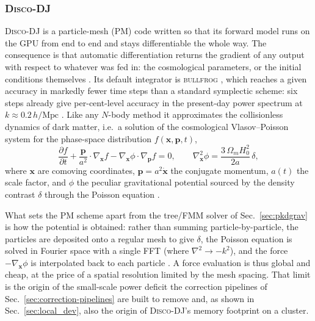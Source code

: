 \documentclass{report}
\begin{document}
\subsubsection{\textsc{Disco-DJ}}
\label{sec:discodj}

\textsc{Disco-DJ} is a particle-mesh (PM) code written so that its forward model runs on the GPU from end to end and stays differentiable the whole way. The consequence is that automatic differentiation returns the gradient of any output with respect to whatever was fed in: the cosmological parameters, or the initial conditions themselves \cite{list_disco-dj_2026}. Its default integrator is \textsc{bullfrog} \cite{rampf_bullfrog_2025}, which reaches a given accuracy in markedly fewer time steps than a standard symplectic scheme: six steps already give per-cent-level accuracy in the present-day power spectrum at \mbox{$k \approx 0.2\,h/\mathrm{Mpc}$} \cite{list_disco-dj_2026}. Like any $N$-body method it approximates the collisionless dynamics of dark matter, i.e.\ a solution of the cosmological Vlasov--Poisson system for the phase-space distribution $f(\mathbf{x},\mathbf{p},t)$,
\begin{equation}
  \frac{\partial f}{\partial t} + \frac{\mathbf{p}}{a^2}\cdot\nabla_{\mathbf{x}} f - \nabla_{\mathbf{x}}\phi\cdot\nabla_{\mathbf{p}} f = 0,
  \qquad \nabla_{\mathbf{x}}^2\phi = \frac{3\,\Omega_m H_0^2}{2a}\,\delta,
  \label{eq:vlasov_poisson}
\end{equation}
where $\mathbf{x}$ are comoving coordinates, $\mathbf{p} = a^2\dot{\mathbf{x}}$ the conjugate momentum, $a(t)$ the scale factor, and $\phi$ the peculiar gravitational potential sourced by the density contrast $\delta$ through the Poisson equation \cite{list_disco-dj_2026}.

What sets the PM scheme apart from the tree/FMM solver of Sec.~\ref{sec:pkdgrav} is how the potential is obtained: rather than summing particle-by-particle, the particles are deposited onto a regular mesh to give $\delta$, the Poisson equation is solved in Fourier space with a single FFT (where $\nabla^2 \to -k^2$), and the force $-\nabla_{\mathbf{x}}\phi$ is interpolated back to each particle \cite{list_disco-dj_2026}. A force evaluation is thus global and cheap, at the price of a spatial resolution limited by the mesh spacing. That limit is the origin of the small-scale power deficit the correction pipelines of Sec.~\ref{sec:correction-pipelines} are built to remove and, as shown in Sec.~\ref{sec:local_dev}, also the origin of \textsc{Disco-DJ}'s memory footprint on a cluster.
\end{document}
